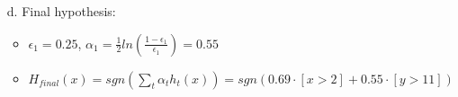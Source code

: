 \begin{enumerate}
\begin{enumerate}
\begin{itemize}
		\end{itemize}
	\item[d.] Final hypothesis:
		\begin{itemize}
		\item $\epsilon_1 = 0.25$, $\alpha_1 = \frac{1}{2} ln(\frac{1-\epsilon_1}{\epsilon_1}) = 0.55$
		\item $H_{final}(x) = sgn(\sum\limits_{t} \alpha_t h_t (x)) = sgn(0.69 \cdot [x > 2] + 0.55 \cdot [y > 11])$
		\end{itemize}
	\end{enumerate}
\end{enumerate}



